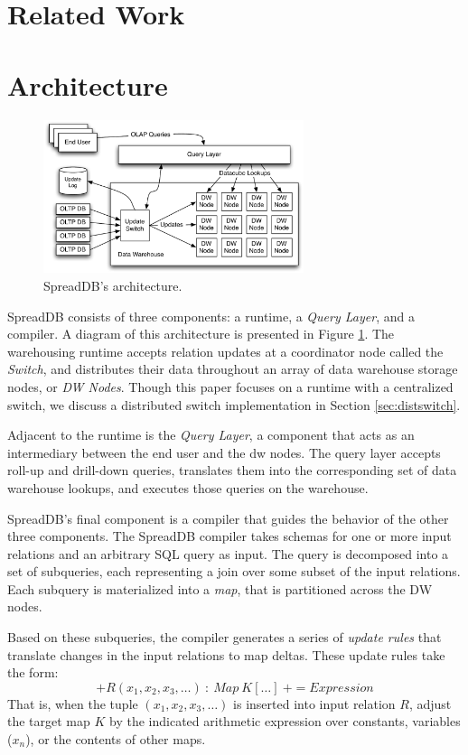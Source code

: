 \documentclass{sig-alternate}
\begin{document}
\section{Related Work}
\label{sec:relatedwork}

\section{Architecture}
\label{sec:architecture}
\begin{figure}
\begin{center}
\includegraphics[width=3in]{images/Architecture.pdf}
\caption{SpreadDB's architecture.}
\label{fig:arch}
\end{center}
\end{figure}
SpreadDB consists of three components: a runtime, a \textit{Query Layer}, and a compiler.  A diagram of this architecture is presented in Figure \ref{fig:arch}.  The warehousing runtime accepts relation updates at a coordinator node called the \textit{Switch}, and distributes their data throughout an array of data warehouse storage nodes, or \textit{DW Nodes}.  Though this paper focuses on a runtime with a centralized switch, we discuss a distributed switch implementation in Section \ref{sec:distswitch}.

Adjacent to the runtime is the \textit{Query Layer}, a component that acts as an intermediary between the end user and the dw nodes.  The query layer accepts roll-up and drill-down queries, translates them into the corresponding set of data warehouse lookups, and executes those queries on the warehouse.

SpreadDB's final component is a compiler that guides the behavior of the other three components.  The SpreadDB compiler takes schemas for one or more input relations and an arbitrary SQL query as input.  The query is decomposed into a set of subqueries, each representing a join over some subset of the input relations.  Each subquery is materialized into a \textit{map}, that is partitioned across the DW nodes.  

Based on these subqueries, the compiler generates a series of \textit{update rules} that translate changes in the input relations to map deltas.  These update rules take the form:
$$+R(x_1, x_2, x_3, \ldots)\ :\ Map\ K[\ldots]\ += Expression$$
That is, when the tuple $(x_1, x_2, x_3, \ldots)$ is inserted into input relation $R$, adjust the target map $K$ by the indicated arithmetic expression over constants, variables ($x_n$), or the contents of other maps.  
 
\end{document}
